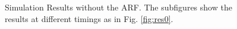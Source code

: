 \documentclass[a4paper,12pt, oneside]{book}
\begin{document}
\begin{figure}[tbp]
 \caption{Simulation Results without the ARF. The subfigures show the results at different timings as in Fig. \ref{fig:res0}.}
 \label{fig:res3}
\end{figure}
\end{document}
